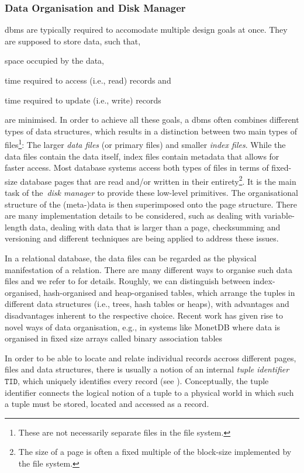 \subsubsection{Data Organisation and Disk Manager}
\acrshort{dbms} are typically required to accomodate multiple design goals at once. They are supposed to store data, such that,
\begin{enumerate*}[label=(\roman*)]
    \item space occupied by the data,
    \item time required to access (i.e., read) records and
    \item time required to update (i.e., write) records
\end{enumerate*}
are minimised. In order to achieve all these goals, a \acrshort{dbms} often combines different types of data structures, which results in a distinction between two main types of files\footnote{These are not necessarily separate files in the file system.}: The larger \emph{data files} (or primary files) and smaller \emph{index files}. While the data files contain the data itself, index files contain metadata that allows for faster access. Most database systems access both types of files in terms of fixed-size database pages that are read and/or written in their entirety\footnote{The size of a page is often a fixed multiple of the block-size implemented by the file system.}. It is the main task of the \emph{disk manager} to provide these low-level primitives. The organisational structure of the (meta-)data is then superimposed onto the page structure. There are many implementation details to be considered, such as dealing with variable-length data, dealing with data that is larger than a page, checksumming and versioning and different techniques are being applied to address these issues.

In a relational database, the data files can be regarded as the physical manifestation of a relation. There are many different ways to organise such data files and we refer to \cite{Petrov:2019Database} for details. Roughly, we can distinguish between index-organised, hash-organised and heap-organised tables, which arrange the tuples in different data structures (i.e., trees, hash tables or heaps), with advantages and disadvantages inherent to the respective choice. Recent work has given rise to novel ways of data organisation, e.g., in systems like MonetDB where data is organised in fixed size arrays called binary association tables \cite{Boncz:2008Breaking}

In order to be able to locate and relate individual records accross different pages, files and data structures, there is usually a notion of an internal \emph{tuple identifier} $\mathtt{TID}$, which uniquely identifies every record (see ). Conceptually, the tuple identifier connects the logical notion of a tuple to a physical world in which such a tuple must be stored, located and accessed as a record.

